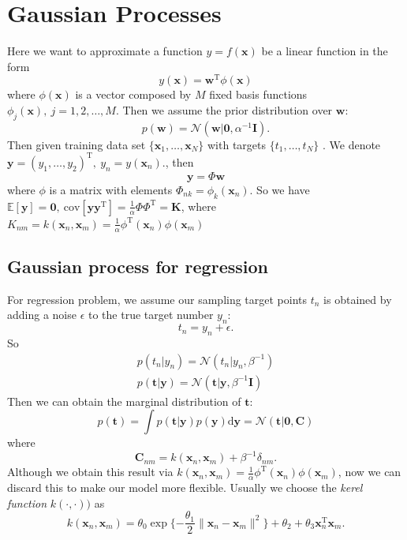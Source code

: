 \documentclass[a4paper]{book}
\newcommand{\normD}{\mathcal{N}}
\newcommand{\mrm}{\mathrm}
\newcommand{\mbf}{\mathbf}
\newcommand{\ud}{\mathrm{d}}
\newcommand{\KK}{\mbf K}
\newcommand{\CC}{\mbf C}
\newcommand{\ww}{\mbf w}
\newcommand{\ttt}{\mbf t}
\newcommand{\xx}{\mbf x}
\newcommand{\yy}{\mbf y}
\newcommand{\bmz}{\bm{0}}
\newcommand{\Exp}{\mathbb{E}}
\newcommand{\rev}{^{-1}}
\newcommand{\trans}{^{\mrm T}}
\begin{document}
\section{Gaussian Processes}

Here we want to approximate a function $y= f(\xx)$ be a linear function in the form
\begin{equation}
    y(\xx) = \ww\trans\phi(\xx)
\end{equation}
where $\phi(\xx)$ is a vector composed by $M$ fixed basis functions $\phi_j(\xx),\ j=1,2,\dots,M$. Then we assume the prior distribution over $\ww$:
\begin{equation}
    p(\ww) = \normD(\ww|\bmz, \alpha\rev\mbf I).
\end{equation}
Then given training data set $\{\xx_1, \dots, \xx_N\}$ with targets $\{t_1,\dots, t_N\}$ . We denote $\yy = (y_1,\dots, y_2)\trans,\ y_n=y(\xx_n).$, then
\begin{equation}
    \yy =  \Phi\ww
\end{equation}
where $\phi$ is a matrix with elements $\Phi_{nk}=\phi_k(\xx_n)$. So we have $\Exp[\yy]=\bmz,\ \mrm{cov}[\yy\yy\trans] = \frac{1}{\alpha}\Phi\Phi\trans=\KK$, where $K_{nm}=k(\xx_n,\xx_m)=\frac{1}{\alpha}\phi\trans(\xx_n)\phi(\xx_m)$

\subsection{Gaussian process for regression}
For regression problem, we assume our sampling target points $t_n$ is obtained by adding a noise $\epsilon$ to the true target number $y_n$:
\begin{equation}
    t_n=y_n+\epsilon.
\end{equation}
So
\begin{gather}
    p(t_n|y_n)=\normD(t_n|y_n, \beta\rev) \\
    p(\ttt|\yy) = \normD(\ttt|\yy,\beta\rev\mbf I)
\end{gather}
Then we can obtain the marginal distribution of $\ttt$:
\begin{equation}
    p(\ttt) = \int p(\ttt|\yy)p(\yy)\ud\yy=\normD(\ttt|\bmz, \CC)
\end{equation}
where
\begin{equation}\label{eq13.1}
    \CC_{nm}=k(\xx_n,\xx_m)+\beta\rev\delta_{nm}.
\end{equation}
Although we obtain this result via $k(\xx_n,\xx_m) = \frac1\alpha\phi\trans(\xx_n)\phi(\xx_m)$, now we can discard this to make our model more flexible. Usually we choose the \emph{kerel function} $k(\cdot,\cdot))$ as
\begin{equation}
    k(\xx_n,\xx_m)=\theta_0\exp\{-\frac{\theta_1}{2}\|\xx_n-\xx_m\|^2\}+\theta_2+\theta_3\xx_n\trans\xx_m.
\end{equation}
\end{document}
